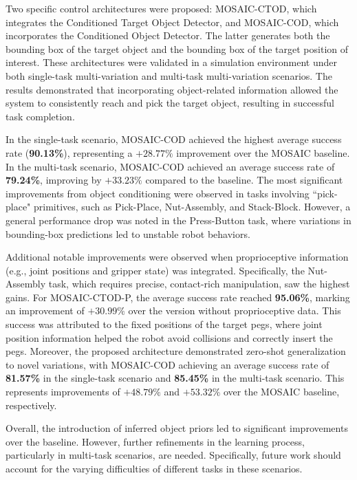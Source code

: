 Two specific control architectures were proposed: MOSAIC-CTOD, which integrates the Conditioned Target Object Detector, and MOSAIC-COD, which incorporates the Conditioned Object Detector. The latter generates both the bounding box of the target object and the bounding box of the target position of interest. These architectures were validated in a simulation environment under both single-task multi-variation and multi-task multi-variation scenarios. The results demonstrated that incorporating object-related information allowed the system to consistently reach and pick the target object, resulting in successful task completion.


In the single-task scenario, MOSAIC-COD achieved the highest average success rate (\textbf{90.13\%}), representing a $+28.77\%$ improvement over the MOSAIC baseline. In the multi-task scenario, MOSAIC-COD achieved an average success rate of \textbf{79.24\%}, improving by $+33.23\%$ compared to the baseline. The most significant improvements from object conditioning were observed in tasks involving ``pick-place" primitives, such as Pick-Place, Nut-Assembly, and Stack-Block. However, a general performance drop was noted in the Press-Button task, where variations in bounding-box predictions led to unstable robot behaviors.

Additional notable improvements were observed when proprioceptive information (e.g., joint positions and gripper state) was integrated. Specifically, the Nut-Assembly task, which requires precise, contact-rich manipulation, saw the highest gains. For MOSAIC-CTOD-P, the average success rate reached \textbf{95.06\%}, marking an improvement of $+30.99\%$ over the version without proprioceptive data. This success was attributed to the fixed positions of the target pegs, where joint position information helped the robot avoid collisions and correctly insert the pegs. Moreover, the proposed architecture demonstrated zero-shot generalization to novel variations, with MOSAIC-COD achieving an average success rate of \textbf{81.57\%} in the single-task scenario and \textbf{85.45\%} in the multi-task scenario. This represents improvements of $+48.79\%$ and $+53.32\%$ over the MOSAIC baseline, respectively.

Overall, the introduction of inferred object priors led to significant improvements over the baseline. However, further refinements in the learning process, particularly in multi-task scenarios, are needed. Specifically, future work should account for the varying difficulties of different tasks in these scenarios.